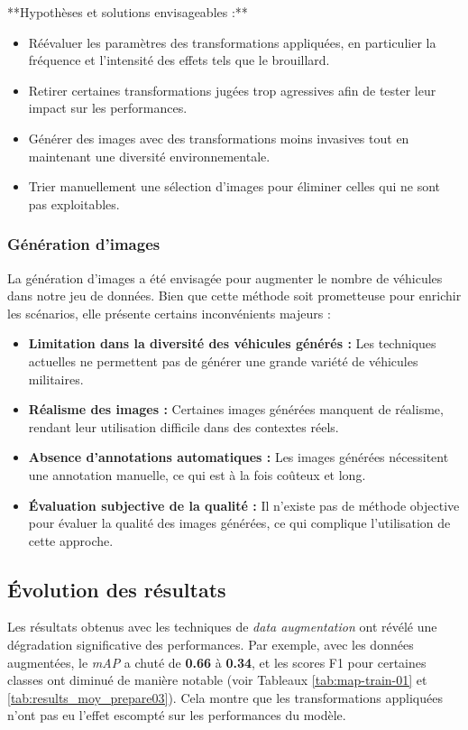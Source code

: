 **Hypothèses et solutions envisageables :**
\begin{itemize}
    \item Réévaluer les paramètres des transformations appliquées, en particulier la fréquence et l’intensité des effets tels que le brouillard.
    \item Retirer certaines transformations jugées trop agressives afin de tester leur impact sur les performances.
    \item Générer des images avec des transformations moins invasives tout en maintenant une diversité environnementale.
    \item Trier manuellement une sélection d'images pour éliminer celles qui ne sont pas exploitables.
\end{itemize}

\subsubsection{Génération d'images}

La génération d'images a été envisagée pour augmenter le nombre de véhicules dans notre jeu de données. Bien que cette méthode soit prometteuse pour enrichir les scénarios, elle présente certains inconvénients majeurs :

\begin{itemize}
    \item \textbf{Limitation dans la diversité des véhicules générés :} Les techniques actuelles ne permettent pas de générer une grande variété de véhicules militaires.
    \item \textbf{Réalisme des images :} Certaines images générées manquent de réalisme, rendant leur utilisation difficile dans des contextes réels.
    \item \textbf{Absence d'annotations automatiques :} Les images générées nécessitent une annotation manuelle, ce qui est à la fois coûteux et long.
    \item \textbf{Évaluation subjective de la qualité :} Il n'existe pas de méthode objective pour évaluer la qualité des images générées, ce qui complique l'utilisation de cette approche.
\end{itemize}

\subsection{Évolution des résultats}

Les résultats obtenus avec les techniques de \textit{data augmentation} ont révélé une dégradation significative des performances. Par exemple, avec les données augmentées, le \textit{mAP} a chuté de \textbf{0.66} à \textbf{0.34}, et les scores F1 pour certaines classes ont diminué de manière notable (voir Tableaux \ref{tab:map-train-01} et \ref{tab:results_moy_prepare03}). Cela montre que les transformations appliquées n'ont pas eu l'effet escompté sur les performances du modèle.

